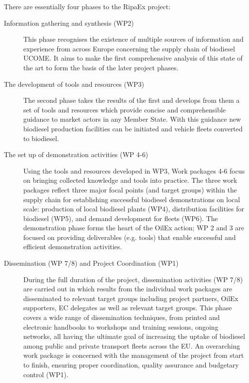 \documentclass[11pt,fleqn,oneside]{book} %
\begin{document}
There are essentially four phases to the RipaEx project:
\begin{description}
	\item[Information gathering and synthesis (WP2)] This phase recognises the existence of multiple sources of information and experience from
    across Europe concerning the supply chain of biodiesel UCOME. It aims to make the first
    comprehensive analysis of this state of the art to form the basis of the later project phases.    
	\item[The development of tools and resources (WP3)] The second phase takes the results of the first and develops from them a set of tools and
    resources which provide concise and comprehensible guidance to market actors in any
    Member State. With this guidance new biodiesel production facilities can be initiated and
    vehicle fleets converted to biodiesel.    
    \item[The set up of demonstration activities (WP 4-6)] Using the tools and resources developed in WP3, Work packages 4-6 focus on bringing
    collected knowledge and tools into practice. The three work packages reflect three major
    focal points (and target groups) within the supply chain for establishing successful biodiesel
    demonstrations on local scale: production of local biodiesel plants (WP4), distribution
    facilities for biodiesel (WP5), and demand development for fleets (WP6). The demonstration
    phase forms the heart of the OilEx action; WP 2 and 3 are focused on providing
    deliverables (e.g. tools) that enable successful and efficient demonstration activities.    
    \item[Dissemination (WP 7/8) and Project Coordination (WP1)] During the full duration of the project, dissemination activities (WP 7/8) are carried out in
    which results from the individual work packages are disseminated to relevant target groups
    including project partners, OilEx supporters, EC delegates as well as relevant target
    groups. This phase covers a wide range of dissemination techniques, from printed and
    electronic handbooks to workshops and training sessions, ongoing networks, all having the
    ultimate goal of increasing the uptake of biodiesel among public and private transport fleets
    across the EU. An overarching work package is concerned with the management of the
    project from start to finish, ensuring proper coordination, quality assurance and budgetary
    control (WP1).
\end{description}
\end{document}
